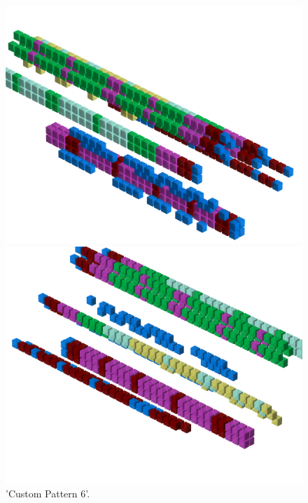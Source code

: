 \begin{figure}[H]
    \centering
    \begin{adjustbox}{width=12cm,center}
      \includegraphics[width=12cm]{src/patterns/pattern14-45.png}%
    \end{adjustbox}
    \begin{adjustbox}{width=12cm,margin=0cm -4cm}
      \includegraphics[width=12cm]{src/patterns/pattern14-225.png}%
    \end{adjustbox}
\caption{'Custom Pattern 6'.}
\end{figure}
\clearpage

